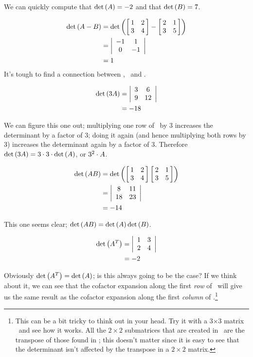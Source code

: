 {We can quickly compute that $\det{\tta} = -2$ and that $\det{\ttb} = 7$. 

\begin{align*}
	\det{\tta-\ttb} &= \det{\bmx{cc}1&2\\3&4\emx-\bmx{cc} 2&1\\ 3&5\emx}\\
	&= \bdt{cc}-1&1\\0&-1\edt \\
	&= 1
\end{align*}
It's tough to find a connection between \det{\tta-\ttb}, \det{\tta}\ and  \det{\ttb}.

\begin{align*}
	\det{3\tta} &= \bdt{cc}3&6\\9&12\edt\\
	&= -18
\end{align*}

We can figure this one out; multiplying one row of \tta\ by 3 increases the determinant by a factor of 3; doing it again (and hence multiplying both rows by 3) increases the determinant again by a factor of 3. Therefore $\det{3\tta} = 3\cdot3\cdot\det{\tta}$, or $3^2\cdot{\tta}$.

\begin{align*}
	\det{\tta\ttb} &= \det{\bmx{cc}1&2\\3&4\emx\bmx{cc} 2&1\\ 3&5\emx}\\
	&=	\bdt{cc}8&11\\18 & 23\edt\\
	&= -14
\end{align*}

This one seems clear; $\det{\tta\ttb} = \det{\tta}\det{\ttb}$.


\begin{align*}
\det{\ttat} & = \bdt{cc} 1&3\\2&4\edt\\
&=	-2
\end{align*}

Obviously $\det{\ttat} = \det{\tta}$; is this always going to be the case? If we think about it, we can see that the cofactor expansion along the first \textit{row} of \tta\ will give us the same result as the cofactor expansion along the first \textit{column} of \ttat.\footnote{This can be a bit tricky to think out in your head. Try it with a 3$\times 3$ matrix \tta\ and see how it works. All the $2\times 2$ submatrices that are created in \ttat\ are the transpose of those found in \tta; this doesn't matter since it is easy to see that the determinant isn't affected by the transpose in a $2\times 2$ matrix.}

}
